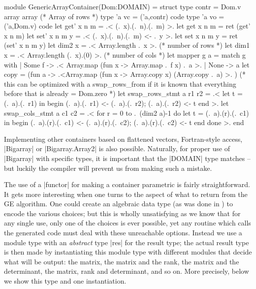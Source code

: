\documentclass{llncs}
\begin{document}
\begin{small}
\begin{code}
module GenericArrayContainer(Dom:DOMAIN) =
  struct
  type contr = Dom.v array array (* Array of rows *)
  type 'a vc = ('a,contr) code
  type 'a vo = ('a,Dom.v) code
  let get' x n m = .< (.~x).(.~n).(.~m) >.
  let get x n m = ret (get' x n m)
  let set' x n m y = .< (.~x).(.~n).(.~m) <- .~y >.
  let set x n m y = ret (set' x n m y)
  let dim2 x = .< Array.length .~x >.       (* number of rows *)
  let dim1 x = .< Array.length (.~x).(0) >. (* number of cols *)
  let mapper g a = match g with
      | Some f -> .< Array.map (fun x -> Array.map .~f x) .~a >.
      | None   -> a
  let copy = (fun a -> .<Array.map (fun x -> Array.copy x) 
                       (Array.copy .~a) >. )
  (* this can be optimized with a swap_rows_from if it is known that
     everything before that is already = Dom.zero *)
  let swap_rows_stmt a r1 r2 =
      .< let t = (.~a).(.~r1) in
         begin 
             (.~a).(.~r1) <- (.~a).(.~r2);
             (.~a).(.~r2) <- t
         end >.
  let swap_cols_stmt a c1 c2 = .< 
      for r = 0 to .~(dim2 a)-1 do
          let t = (.~a).(r).(.~c1) in
          begin 
              (.~a).(r).(.~c1) <- (.~a).(r).(.~c2);
              (.~a).(r).(.~c2) <- t
          end
      done  >.
end
\end{code}
\end{small}
\noindent  Implementing other containers based on flattened vectors,
Fortran-style access, |Bigarray| or |Bigarray.Array2| is also possible.
Naturally, for proper use of |Bigarray| with specific types, it is 
important that the |DOMAIN| type matches -- but luckily the compiler 
will prevent us from making such a mistake.

The use of a |functor| for making a container parametric is fairly 
straightforward.  It gets more interesting when one turns to the aspect
of what to return from the GE algorithm.  One could create an algebraic
data type (as was done in \cite{carette04}) to encode the various
choices; but this is wholly unsatisfying as we know that for any single
use, only one of the choices is ever possible, yet any routine which
calls the generated code must deal with these unreachable options.
Instead we use a module type with an \emph{abstract} type |res| for the
result type; the actual result type is then made by instantiating
this module type with different modules that decide what will be 
output: the matrix, the matrix and the rank, the matrix and the
determinant, the matrix, rank and determinant, and so on.  More
precisely, below we show this type and one instantiation.
\end{document}
